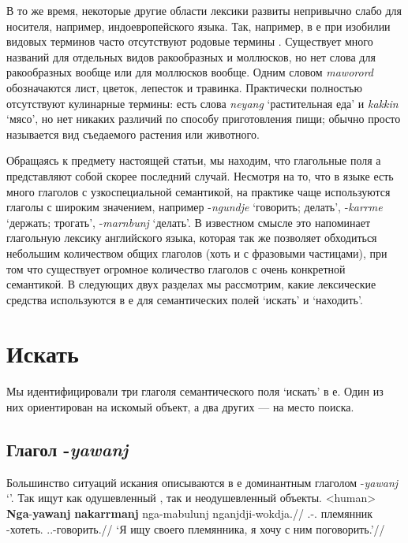 В то же время, некоторые другие области лексики развиты непривычно слабо для носителя, например, индоевропейского языка. Так, например, в  е при изобилии видовых терминов часто отсутствуют родовые термины \parencite[см.\ об этом в][\S2.1, и цитируемые там источники]{gabysinger14}. Существует много названий для отдельных видов ракообразных и моллюсков, но нет слова для ракообразных вообще или для моллюсков вообще. Одним словом \textit{maworord} обозначаются лист, цветок, лепесток и травинка. Практически полностью отсутствуют кулинарные термины: есть слова \textit{neyang} `растительная еда' и \textit{kakkin} `мясо', но нет никаких различий по способу приготовления пищи; обычно просто называется вид съедаемого растения или животного.

Обращаясь к предмету настоящей статьи, мы находим, что глагольные поля  а представляют собой скорее последний случай. Несмотря на то, что в языке есть много глаголов с узкоспециальной семантикой, на практике чаще используются глаголы с широким значением, например -\textit{ngundje} `говорить; делать', -\textit{karrme} `держать; трогать', -\textit{marnbunj} `делать'. В известном смысле это напоминает глагольную лексику английского языка, которая так же позволяет обходиться небольшим количеством общих глаголов (хоть и с фразовыми частицами), при том что существует огромное количество глаголов с очень конкретной семантикой. В следующих двух разделах мы рассмотрим, какие лексические средства используются в  е для семантических полей `искать' и `находить'.


\section{Искать}
\label{sec:search}
Мы идентифицировали три глаголя семантического поля `искать' в  е. Один из них ориентирован на искомый объект, а два других --- на место поиска.
\subsection{Глагол -\textit{yawanj}}
\label{sec:yaw}
Большинство ситуаций искания описываются в  е доминантным глаголом -\textit{yawanj} `\yaw'. Так ищут как одушевленный , так и неодушевленный  объекты.
\ex<human>\begingl
\gla \textbf{Nga}-\textbf{yawanj} \textbf{nakarrmanj} nga-mabulunj nganjdji-wokdja.//
\glb \Fsg.\Real-\yaw.\Np{} племянник \nga-хотеть.\Np{} \Fdu.\Excl.\Fut-говорить.\Np{}//
\glft `Я ищу своего племянника, я хочу с ним поговорить.'//%
\endgl \xe

